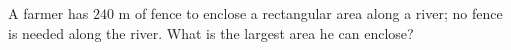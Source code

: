A farmer has $240$ m of fence to enclose a rectangular area along a river; no fence is needed along the river. What is the largest area he can enclose?
